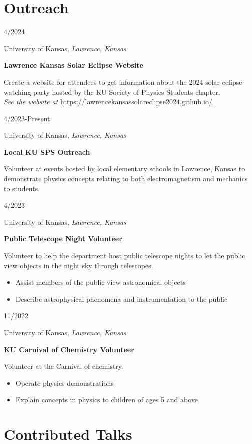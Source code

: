 \documentclass[12pt]{article}
\newenvironment{entry}[4]{
  \medskip
  \begin{minipage}[t]{0.75in}
    #3
  \end{minipage}
  \begin{minipage}[t]{\dimexpr\textwidth-0.75in}
    #1, \textit{#2}

    \textbf{#4}
    
    \smallskip
}{
  \end{minipage}
}
\begin{document}
\section*{Outreach}\vspace{-1ex}

\begin{entry}{University of Kansas}{Lawrence, Kansas}{4/2024}{Lawrence Kansas Solar Eclipse Website}
  Create a website for attendees to get information about the 2024 solar eclipse watching party hosted by the KU Society of Physics Students chapter.
  \medskip\\
  \textit{See the website at} \href{https://lawrencekansassolareclipse2024.github.io/}{https://lawrencekansassolareclipse2024.github.io/}
\end{entry}

\begin{entry}{University of Kansas}{Lawrence, Kansas}{4/2023-Present}{Local KU SPS Outreach}
  Volunteer at events hosted by local elementary schools in Lawrence, Kansas to demonstrate physics concepts relating to both electromagnetism and mechanics to students.
\end{entry}

\begin{entry}{University of Kansas}{Lawrence, Kansas}{4/2023}{Public Telescope Night Volunteer}
  Volunteer to help the department host public telescope nights to let the
  public view objects in the night sky through telescopes.
  \begin{itemize}
    \item Assist members of the public view astronomical objects
    \item Describe astrophysical phenomena and instrumentation to the public
  \end{itemize}
\end{entry}

\begin{entry}{University of Kansas}{Lawrence, Kansas}{11/2022}{KU Carnival of Chemistry Volunteer}
  Volunteer at the Carnival of chemistry.
  \begin{itemize}
    \item Operate physics demonstrations
    \item Explain concepts in physics to children of ages 5 and above
  \end{itemize}
\end{entry}

\section*{Contributed Talks}\vspace{-1ex}
\end{document}

